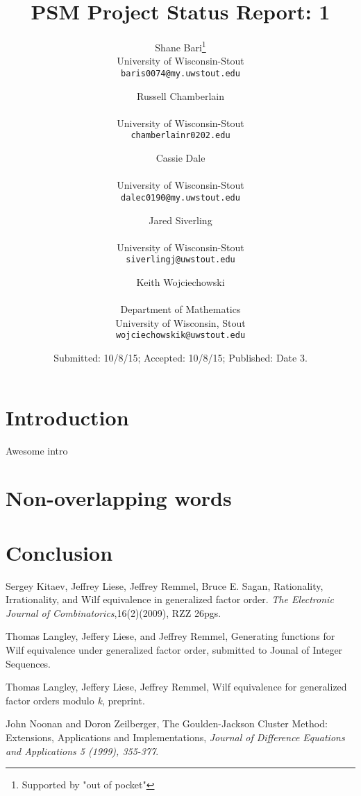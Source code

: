 \documentclass[11pt]{article}
\title{PSM Project Status Report: 1}
\author{
Shane Bari\footnote{Supported by "out of pocket"}\\
\small University of Wisconsin-Stout\\[-0.8ex]
\small \texttt{baris0074@my.uwstout.edu}
\and
Russell Chamberlain\addtocounter{footnote}{0}\footnotemark[\value{footnote}]\\
\small University of Wisconsin-Stout\\[-0.8ex]
\small \texttt{chamberlainr0202.edu}
\and
Cassie Dale\addtocounter{footnote}{0}\footnotemark[\value{footnote}]\\
\small University of Wisconsin-Stout\\[-0.8ex]
\small \texttt{dalec0190@my.uwstout.edu}
\and
Jared Siverling\addtocounter{footnote}{0}\footnotemark[\value{footnote}]\\
\small University of Wisconsin-Stout\\[-0.8ex]
\small \texttt{siverlingj@uwstout.edu}
\and
Keith Wojciechowski\addtocounter{footnote}{0}\footnotemark[\value{footnote}]\\
\small Department of Mathematics\\[-0.8ex]
\small University of Wisconsin, Stout\\[-0.8ex]
\small \texttt{wojciechowskik@uwstout.edu}
}
\date{\small Submitted: 10/8/15;  Accepted: 10/8/15;
 Published: Date 3.}
\begin{document}
\maketitle

\section{Introduction}\label{intro}
Awesome intro

\section{Non-overlapping words}\label{nonov}

\section{Conclusion}\label{conclu}


\begin{thebibliography}{20}

 Sergey Kitaev, Jeffrey Liese, Jeffrey Remmel, Bruce E. Sagan, Rationality, Irrationality, and Wilf equivalence in generalized factor order. \emph{The Electronic Journal of Combinatorics},16(2)(2009), RZZ 26pgs.

 Thomas Langley, Jeffery Liese, and Jeffrey Remmel, Generating functions for Wilf equivalence under generalized factor order, submitted to Jounal of Integer Sequences.

 Thomas Langley, Jeffery Liese, Jeffrey Remmel, Wilf equivalence for generalized factor orders modulo \emph{k}, preprint.

 John Noonan and Doron Zeilberger, The Goulden-Jackson Cluster Method: Extensions, Applications and Implementations,\emph{ Journal of Difference Equations and Applications 5 (1999), 355-377}.

\end{thebibliography}
\end{document}
